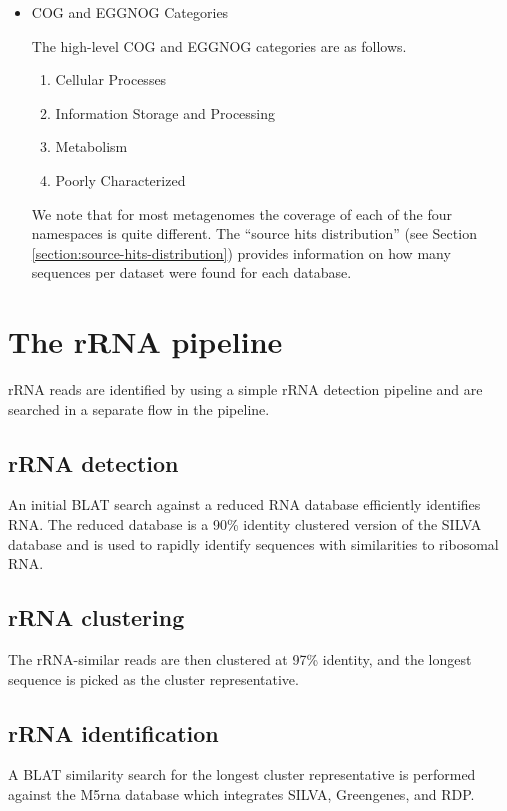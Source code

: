 \documentclass[12pt,fullpage]{report}
\begin{document}
\begin{itemize}
\item COG and EGGNOG Categories

The high-level COG and EGGNOG categories are as follows.
\begin{enumerate}
\item Cellular Processes
\item Information Storage and Processing
\item Metabolism
\item Poorly Characterized
\end{enumerate}

We note that for most metagenomes the coverage of each of the four namespaces is quite different. The ``source hits distribution'' (see Section \ref{section:source-hits-distribution}) provides information on how many sequences per dataset
were found for each database.
\end{itemize}
\section{The rRNA pipeline}

\gls{rRNA} reads are identified by using a simple rRNA detection pipeline and are searched in a separate flow in the pipeline.
\subsection{rRNA detection}
An initial BLAT \cite{BLAT} search against a reduced RNA database efficiently identifies RNA. The reduced database is a 90\% identity clustered version of the SILVA database and is used to rapidly identify sequences with similarities to ribosomal RNA.


\subsection{rRNA clustering}
The rRNA-similar reads are then clustered at 97\% identity, and the longest sequence is picked as the cluster representative.
\subsection{rRNA identification}
 A BLAT similarity search for the longest cluster representative is performed against the M5rna database which integrates SILVA\cite{SILVA}, Greengenes\cite{GREENGENES}, and RDP\cite{RDP}.
\end{document}

